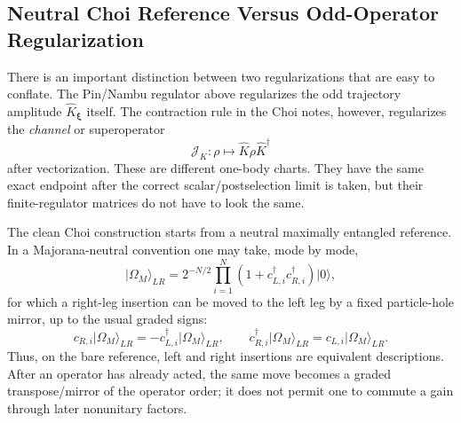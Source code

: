 \documentclass[aps,prb,onecolumn,nofootinbib,superscriptaddress]{revtex4-2}
\newcommand{\ket}[1]{\lvert #1\rangle}
\newcommand{\bxi}{{\boldsymbol{\xi}}}
\theoremstyle{plain}
\theoremstyle{definition}
\begin{document}
\subsection{Neutral Choi Reference Versus Odd-Operator Regularization}
\label{sec:neutral-choi-doubled-regulator}

There is an important distinction between two regularizations that are easy to
conflate.  The Pin/Nambu regulator above regularizes the odd trajectory
amplitude \(\hat K_\bxi\) itself.  The contraction rule in the Choi notes,
however, regularizes the \emph{channel} or superoperator
\begin{equation}
  \mathcal J_K:\rho\mapsto \hat K\rho\hat K^\dagger
  \label{eq:jump-superoperator-definition}
\end{equation}
after vectorization.  These are different one-body charts.  They have the
same exact endpoint after the correct scalar/postselection limit is taken, but
their finite-regulator matrices do not have to look the same.

The clean Choi construction starts from a neutral maximally entangled
reference.  In a Majorana-neutral convention one may take, mode by mode,
\begin{equation}
  \ket{\Omega_M}_{LR}
  =
  2^{-N/2}\prod_{i=1}^N
  \left(1+c_{L,i}^\dagger c_{R,i}^\dagger\right)\ket{0},
  \label{eq:majorana-neutral-reference}
\end{equation}
for which a right-leg insertion can be moved to the left leg by a fixed
particle-hole mirror, up to the usual graded signs:
\begin{equation}
  c_{R,i}\ket{\Omega_M}_{LR}
  =
  -c_{L,i}^\dagger\ket{\Omega_M}_{LR},
  \qquad
  c_{R,i}^\dagger\ket{\Omega_M}_{LR}
  =
  c_{L,i}\ket{\Omega_M}_{LR}.
  \label{eq:neutral-reference-intertwiner}
\end{equation}
Thus, on the bare reference, left and right insertions are equivalent
descriptions.  After an operator has already acted, the same move becomes a
graded transpose/mirror of the operator order; it does not permit one to
commute a gain through later nonunitary factors.
\end{document}
